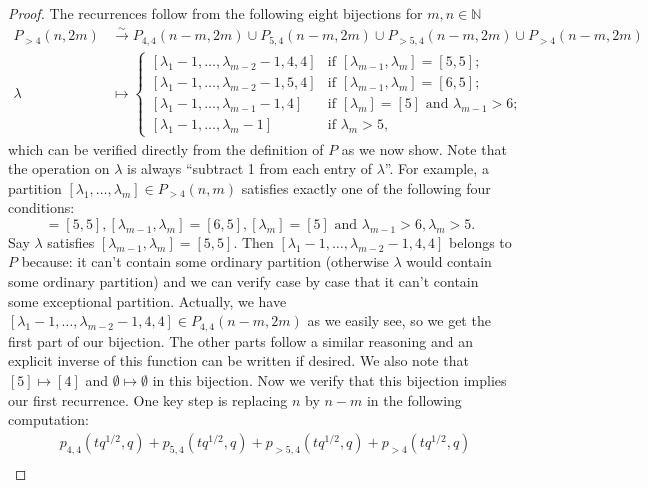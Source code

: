 \documentclass[a4paper, 12pt, reqno]{amsart}
\theoremstyle{remark}
\begin{document}
\begin{proof}
  The recurrences follow from the following eight bijections for $m, n \in \mathbb{N}$
  \begin{align*}
    P_{>4}(n, 2m) &\xrightarrow{\sim} P_{4, 4}(n - m, 2m) \cup P_{5, 4}(n - m, 2m) \cup P_{>5, 4}(n - m, 2m) \cup P_{>4}(n - m, 2m) \\
    \lambda &\mapsto
              \begin{cases}
                [\lambda_1 - 1, \dots, \lambda_{m - 2} - 1, 4, 4] &\text{if }[\lambda_{m - 1}, \lambda_m] = [5, 5]; \\
                [\lambda_1 - 1, \dots, \lambda_{m - 2} - 1, 5, 4] &\text{if }[\lambda_{m - 1}, \lambda_m] = [6, 5]; \\
                [\lambda_1 - 1, \dots, \lambda_{m - 1} - 1, 4] &\text{if }[\lambda_m] = [5]\text{ and }\lambda_{m - 1} > 6; \\
                [\lambda_1 - 1, \dots, \lambda_m - 1] &\text{if }\lambda_m > 5,
              \end{cases}
  \end{align*}
  which can be verified directly from the definition of $P$ as we now show.
  Note that the operation on $\lambda$ is always ``subtract 1 from each entry of $\lambda$''.
  For example, a partition $[\lambda_1, \dots, \lambda_m] \in P_{>4}(n, m)$ satisfies exactly one of the following four conditions:
  \begin{equation*}
    [\lambda_{m - 1}, \lambda_m] = [5, 5], [\lambda_{m - 1}, \lambda_m] = [6, 5], [\lambda_m] = [5]\text{ and }\lambda_{m - 1} > 6, \lambda_m > 5.
  \end{equation*}
  Say $\lambda$ satisfies $[\lambda_{m - 1}, \lambda_m] = [5, 5]$.
  Then $[\lambda_1 - 1, \dots, \lambda_{m - 2} - 1, 4, 4]$ belongs to $P$ because: it can't contain some ordinary partition (otherwise $\lambda$ would contain some ordinary partition) and we can verify case by case that it can't contain some exceptional partition.
  Actually, we have $[\lambda_1 - 1, \dots, \lambda_{m - 2} - 1, 4, 4] \in P_{4, 4}(n - m, 2m)$ as we easily see, so we get the first part of our bijection.
  The other parts follow a similar reasoning and an explicit inverse of this function can be written if desired.
  We also note that $[5] \mapsto [4]$ and $\emptyset \mapsto \emptyset$ in this bijection.
  Now we verify that this bijection implies our first recurrence.
  One key step is replacing $n$ by $n - m$ in the following computation:
  \begin{align*}
    &p_{4, 4}(tq^{1/2}, q) + p_{5, 4}(tq^{1/2}, q) + p_{>5, 4}(tq^{1/2}, q) + p_{>4}(tq^{1/2}, q) \\

\end{align*}
\end{proof}
\end{document}
